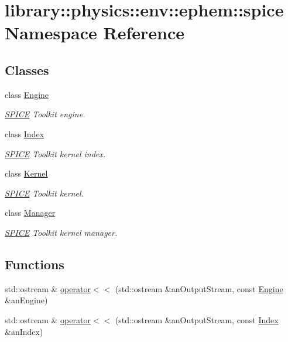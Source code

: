 \hypertarget{namespacelibrary_1_1physics_1_1env_1_1ephem_1_1spice}{}\section{library\+:\+:physics\+:\+:env\+:\+:ephem\+:\+:spice Namespace Reference}
\label{namespacelibrary_1_1physics_1_1env_1_1ephem_1_1spice}
\subsection*{Classes}
\begin{DoxyCompactItemize}
\item 
class \hyperlink{classlibrary_1_1physics_1_1env_1_1ephem_1_1spice_1_1_engine}{Engine}
\begin{DoxyCompactList}\small\item\em \hyperlink{classlibrary_1_1physics_1_1env_1_1ephem_1_1_s_p_i_c_e}{S\+P\+I\+CE} Toolkit engine. \end{DoxyCompactList}\item 
class \hyperlink{classlibrary_1_1physics_1_1env_1_1ephem_1_1spice_1_1_index}{Index}
\begin{DoxyCompactList}\small\item\em \hyperlink{classlibrary_1_1physics_1_1env_1_1ephem_1_1_s_p_i_c_e}{S\+P\+I\+CE} Toolkit kernel index. \end{DoxyCompactList}\item 
class \hyperlink{classlibrary_1_1physics_1_1env_1_1ephem_1_1spice_1_1_kernel}{Kernel}
\begin{DoxyCompactList}\small\item\em \hyperlink{classlibrary_1_1physics_1_1env_1_1ephem_1_1_s_p_i_c_e}{S\+P\+I\+CE} Toolkit kernel. \end{DoxyCompactList}\item 
class \hyperlink{classlibrary_1_1physics_1_1env_1_1ephem_1_1spice_1_1_manager}{Manager}
\begin{DoxyCompactList}\small\item\em \hyperlink{classlibrary_1_1physics_1_1env_1_1ephem_1_1_s_p_i_c_e}{S\+P\+I\+CE} Toolkit kernel manager. \end{DoxyCompactList}\end{DoxyCompactItemize}
\subsection*{Functions}
\begin{DoxyCompactItemize}
\item 
std\+::ostream \& \hyperlink{namespacelibrary_1_1physics_1_1env_1_1ephem_1_1spice_aca63ebc577208377f5e6e0dfd970417a}{operator$<$$<$} (std\+::ostream \&an\+Output\+Stream, const \hyperlink{classlibrary_1_1physics_1_1env_1_1ephem_1_1spice_1_1_engine}{Engine} \&an\+Engine)
\item 
std\+::ostream \& \hyperlink{namespacelibrary_1_1physics_1_1env_1_1ephem_1_1spice_ac579bfe92240f205e10a9e64ce5eb75d}{operator$<$$<$} (std\+::ostream \&an\+Output\+Stream, const \hyperlink{classlibrary_1_1physics_1_1env_1_1ephem_1_1spice_1_1_index}{Index} \&an\+Index)
\end{DoxyCompactItemize}
